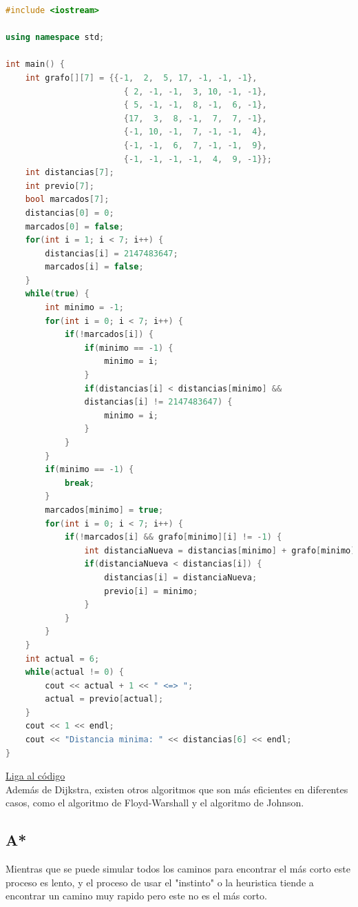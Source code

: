 \documentclass{article}
\begin{document}
\begin{lstlisting}[language=C++, caption=Algoritmo de Dijkstra]
#include <iostream>

using namespace std;

int main() {
    int grafo[][7] = {{-1,  2,  5, 17, -1, -1, -1},
                        { 2, -1, -1,  3, 10, -1, -1},
                        { 5, -1, -1,  8, -1,  6, -1},
                        {17,  3,  8, -1,  7,  7, -1},
                        {-1, 10, -1,  7, -1, -1,  4},
                        {-1, -1,  6,  7, -1, -1,  9},
                        {-1, -1, -1, -1,  4,  9, -1}};
    int distancias[7];
    int previo[7];
    bool marcados[7];
    distancias[0] = 0;
    marcados[0] = false;
    for(int i = 1; i < 7; i++) {
        distancias[i] = 2147483647;
        marcados[i] = false;
    }
    while(true) {
        int minimo = -1;
        for(int i = 0; i < 7; i++) {
            if(!marcados[i]) {
                if(minimo == -1) {
                    minimo = i;
                }
                if(distancias[i] < distancias[minimo] &&
                distancias[i] != 2147483647) {
                    minimo = i;
                }
            }
        }
        if(minimo == -1) {
            break;
        }
        marcados[minimo] = true;
        for(int i = 0; i < 7; i++) {
            if(!marcados[i] && grafo[minimo][i] != -1) {
                int distanciaNueva = distancias[minimo] + grafo[minimo][i];
                if(distanciaNueva < distancias[i]) {
                    distancias[i] = distanciaNueva;
                    previo[i] = minimo;
                }
            }
        }
    }
    int actual = 6;
    while(actual != 0) {
        cout << actual + 1 << " <=> ";
        actual = previo[actual];
    }
    cout << 1 << endl;
    cout << "Distancia minima: " << distancias[6] << endl;
}
\end{lstlisting}
\href{https://repl.it/@Jamesscn/Algoritmo-de-Dijkstra}{Liga al código} \\

Además de Dijkstra, existen otros algoritmos que son más eficientes en diferentes casos, como el algoritmo de Floyd-Warshall y el algoritmo de Johnson.

\subsection{A*}

Mientras que se puede simular todos los caminos para encontrar el más corto este proceso es lento, y el proceso de usar el "instinto" o la heuristica tiende a encontrar un camino muy rapido pero este no es el más corto.
\end{document}
